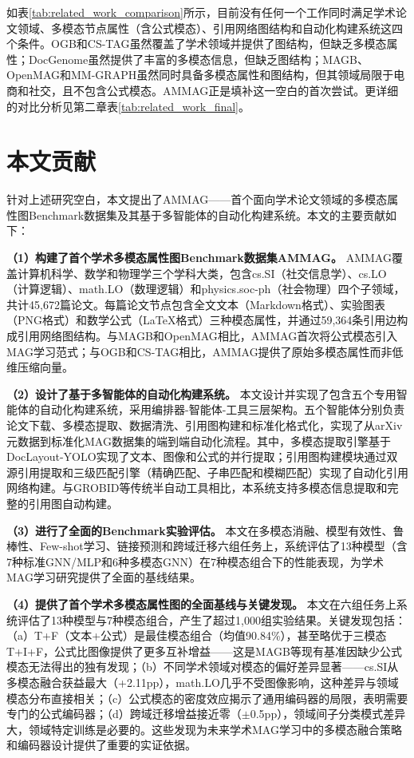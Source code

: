 如表\ref{tab:related_work_comparison}所示，目前没有任何一个工作同时满足学术论文领域、多模态节点属性（含公式模态）、引用网络图结构和自动化构建系统这四个条件。OGB和CS-TAG虽然覆盖了学术领域并提供了图结构，但缺乏多模态属性；DocGenome虽然提供了丰富的多模态信息，但缺乏图结构；MAGB、OpenMAG和MM-GRAPH虽然同时具备多模态属性和图结构，但其领域局限于电商和社交，且不包含公式模态。AMMAG正是填补这一空白的首次尝试。更详细的对比分析见第二章表\ref{tab:related_work_final}。

\section{本文贡献}

针对上述研究空白，本文提出了AMMAG——首个面向学术论文领域的多模态属性图Benchmark数据集及其基于多智能体的自动化构建系统。本文的主要贡献如下：

\textbf{（1）构建了首个学术多模态属性图Benchmark数据集AMMAG。}
AMMAG覆盖计算机科学、数学和物理学三个学科大类，包含cs.SI（社交信息学）、cs.LO（计算逻辑）、math.LO（数理逻辑）和physics.soc-ph（社会物理）四个子领域，共计45,672篇论文。每篇论文节点包含全文文本（Markdown格式）、实验图表（PNG格式）和数学公式（LaTeX格式）三种模态属性，并通过59,364条引用边构成引用网络图结构。与MAGB\cite{yan2025magb}和OpenMAG\cite{wan2026openmag}相比，AMMAG首次将公式模态引入MAG学习范式；与OGB\cite{hu2020ogb}和CS-TAG\cite{yan2023cstag}相比，AMMAG提供了原始多模态属性而非低维压缩向量。

\textbf{（2）设计了基于多智能体的自动化构建系统。}
本文设计并实现了包含五个专用智能体的自动化构建系统，采用编排器-智能体-工具三层架构。五个智能体分别负责论文下载、多模态提取、数据清洗、引用图构建和标准化格式化，实现了从arXiv元数据到标准化MAG数据集的端到端自动化流程。其中，多模态提取引擎基于DocLayout-YOLO\cite{zhao2024doclayoutyolo}实现了文本、图像和公式的并行提取；引用图构建模块通过双源引用提取和三级匹配引擎（精确匹配、子串匹配和模糊匹配）实现了自动化引用网络构建。与GROBID\cite{lopez2009grobid}等传统半自动工具相比，本系统支持多模态信息提取和完整的引用图自动构建。

\textbf{（3）进行了全面的Benchmark实验评估。}
本文在多模态消融、模型有效性、鲁棒性、Few-shot学习、链接预测和跨域迁移六组任务上，系统评估了13种模型（含7种标准GNN/MLP和6种多模态GNN）在7种模态组合下的性能表现，为学术MAG学习研究提供了全面的基线结果。

\textbf{（4）提供了首个学术多模态属性图的全面基线与关键发现。}
本文在六组任务上系统评估了13种模型与7种模态组合，产生了超过1,000组实验结果。关键发现包括：（a）T+F（文本+公式）是最佳模态组合（均值90.84\%），甚至略优于三模态T+I+F，公式比图像提供了更多互补增益——这是MAGB\cite{yan2025magb}等现有基准因缺少公式模态无法得出的独有发现；（b）不同学术领域对模态的偏好差异显著——cs.SI从多模态融合获益最大（+2.11pp），math.LO几乎不受图像影响，这种差异与领域模态分布直接相关；（c）公式模态的密度效应揭示了通用编码器的局限，表明需要专门的公式编码器；（d）跨域迁移增益接近零（$\pm$0.5pp），领域间子分类模式差异大，领域特定训练是必要的。这些发现为未来学术MAG学习中的多模态融合策略和编码器设计提供了重要的实证依据。

